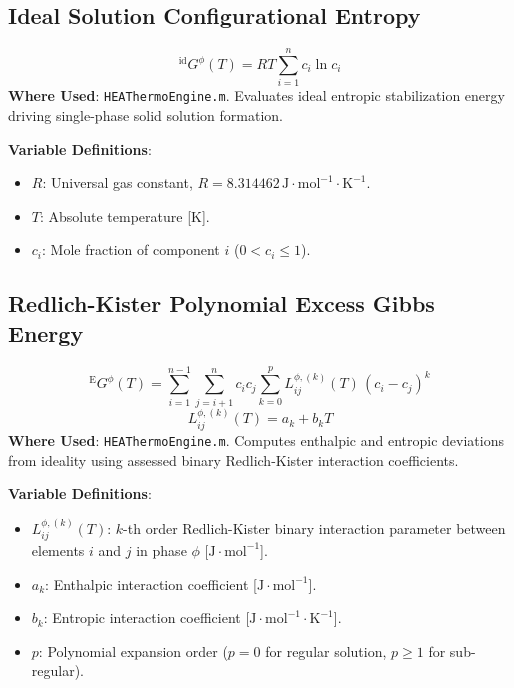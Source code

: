 \documentclass[11pt,a4paper]{article}
\begin{document}
\subsection{Ideal Solution Configurational Entropy}
\begin{equation}
{^{\text{id}}}G^\phi(T) = R T \sum_{i=1}^n c_i \ln c_i
\end{equation}
\textbf{Where Used}: \texttt{HEAThermoEngine.m}. Evaluates ideal entropic stabilization energy driving single-phase solid solution formation.

\noindent\textbf{Variable Definitions}:
\begin{itemize}
  \item $R$: Universal gas constant, $R = 8.314462 \, \text{J}\cdot\text{mol}^{-1}\cdot\text{K}^{-1}$.
  \item $T$: Absolute temperature [$\text{K}$].
  \item $c_i$: Mole fraction of component $i$ ($0 < c_i \le 1$).
\end{itemize}

\subsection{Redlich-Kister Polynomial Excess Gibbs Energy}
\begin{equation}
{^{\text{E}}}G^\phi(T) = \sum_{i=1}^{n-1}\sum_{j=i+1}^n c_i c_j \sum_{k=0}^p L_{ij}^{\phi, (k)}(T) \, (c_i - c_j)^k
\end{equation}
\begin{equation}
L_{ij}^{\phi, (k)}(T) = a_k + b_k T
\end{equation}
\textbf{Where Used}: \texttt{HEAThermoEngine.m}. Computes enthalpic and entropic deviations from ideality using assessed binary Redlich-Kister interaction coefficients.

\noindent\textbf{Variable Definitions}:
\begin{itemize}
  \item $L_{ij}^{\phi, (k)}(T)$: $k$-th order Redlich-Kister binary interaction parameter between elements $i$ and $j$ in phase $\phi$ [$\text{J}\cdot\text{mol}^{-1}$].
  \item $a_k$: Enthalpic interaction coefficient [$\text{J}\cdot\text{mol}^{-1}$].
  \item $b_k$: Entropic interaction coefficient [$\text{J}\cdot\text{mol}^{-1}\cdot\text{K}^{-1}$].
  \item $p$: Polynomial expansion order ($p = 0$ for regular solution, $p \ge 1$ for sub-regular).
\end{itemize}
\end{document}
